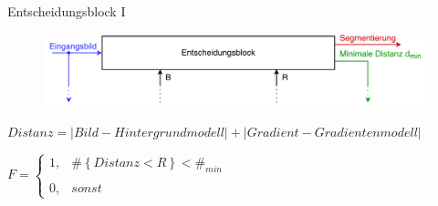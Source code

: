 \documentclass[hyperref={pdfpagelabels=false}]{beamer}
\begin{document}
\begin{frame}{Entscheidungsblock I}
	\begin{figure}
		\centering
		\includegraphics[width=\linewidth]{./Bilder/PDF/decision_block.pdf}
	\end{figure}

	\begin{center}
		\small
		$ Distanz = | Bild - Hintergrundmodell | + | Gradient - Gradientenmodell | $
	\end{center}
	
	\vspace{2em}
	
	$ F = \left\{\begin{array}{ll} 1, & \#\left\{ Distanz < R \right\} < \#_{min} \\
				& \\
				0, & sonst\end{array}\right. $
\end{frame}
\end{document}
